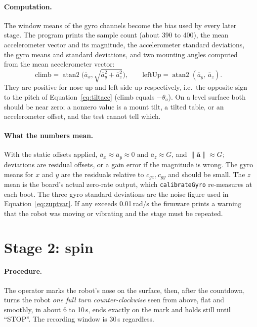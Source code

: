 \documentclass[11pt,a4paper]{report}
\newcommand{\code}[1]{\texttt{#1}}
\begin{document}
\paragraph{Computation.} The window means of the gyro channels become the bias used by every later stage. The program prints the sample count (about 390 to 400), the mean accelerometer vector and its magnitude, the accelerometer standard deviations, the gyro means and standard deviations, and two mounting angles computed from the mean accelerometer vector:
\begin{equation}
  \text{climb}=\operatorname{atan2}\bigl(\bar a_x,\sqrt{\bar a_y^2+\bar a_z^2}\bigr),\qquad
  \text{leftUp}=\operatorname{atan2}(\bar a_y,\,\bar a_z). \label{eq:climb}
\end{equation}
They are positive for nose up and left side up respectively, i.e.\ the opposite sign to the pitch of Equation~\eqref{eq:tiltacc} (climb equals $-\theta_a$). On a level surface both should be near zero; a nonzero value is a mount tilt, a tilted table, or an accelerometer offset, and the test cannot tell which.

\paragraph{What the numbers mean.} With the static offsets applied, $\bar a_x\approx\bar a_y\approx0$ and $\bar a_z\approx G$, and $\lVert\bar{\mathbf a}\rVert\approx G$; deviations are residual offsets, or a gain error if the magnitude is wrong. The gyro means for $x$ and $y$ are the residuals relative to $c_{gx},c_{gy}$ and should be small. The $z$ mean is the board's actual zero-rate output, which \code{calibrateGyro} re-measures at each boot. The three gyro standard deviations are the noise figure used in Equation~\eqref{eq:zuptvar}. If any exceeds 0.01\,rad/s the firmware prints a warning that the robot was moving or vibrating and the stage must be repeated.

\section{Stage 2: spin}\label{sec:s2}
\paragraph{Procedure.} The operator marks the robot's nose on the surface, then, after the countdown, turns the robot \emph{one full turn counter-clockwise} seen from above, flat and smoothly, in about 6 to 10\,s, ends exactly on the mark and holds still until ``STOP''. The recording window is 30\,s regardless.
\end{document}

